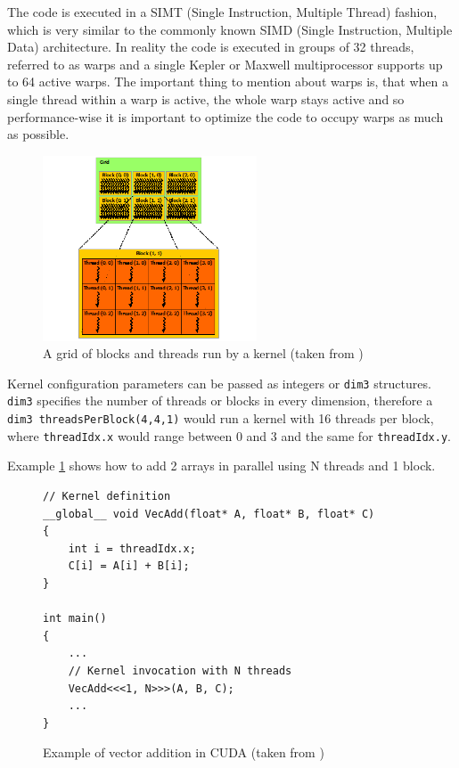 The code is executed in a SIMT (Single Instruction, Multiple Thread) fashion, which is very similar to the commonly known SIMD (Single Instruction, Multiple Data) architecture. In reality the code is executed in groups of 32 threads, referred to as warps and a single Kepler or Maxwell multiprocessor supports up to 64 active warps. The important thing to mention about warps is, that when a single thread within a warp is active, the whole warp stays active and so performance-wise it is important to optimize the code to occupy warps as much as possible.

\begin{center}
\begin{figure}[ht]
	\centering\includegraphics[height=5.5cm]{fig/grid-of-thread-blocks.png}
	\caption{A grid of blocks and threads run by a kernel (taken from \cite{cuda-toolkit-docs})}
\end{figure}
\end{center}

Kernel configuration parameters can be passed as integers or \verb|dim3| structures. \verb|dim3| specifies the number of threads or blocks in every dimension, therefore a \verb|dim3 threadsPerBlock(4,4,1)| would run a kernel with 16 threads per block, where \verb|threadIdx.x| would range between 0 and 3 and the same for \verb|threadIdx.y|.

Example \ref{code:cuda-example} shows how to add 2 arrays in parallel using N threads and 1 block.

\begin{figure}[ht]
\begin{verbatim}
// Kernel definition
__global__ void VecAdd(float* A, float* B, float* C)
{
    int i = threadIdx.x;
    C[i] = A[i] + B[i];
}

int main()
{
    ...
    // Kernel invocation with N threads
    VecAdd<<<1, N>>>(A, B, C);
    ...
}
\end{verbatim}

\caption{Example of vector addition in CUDA (taken from \cite{cuda-toolkit-docs})}
\label{code:cuda-example}
\end{figure}

